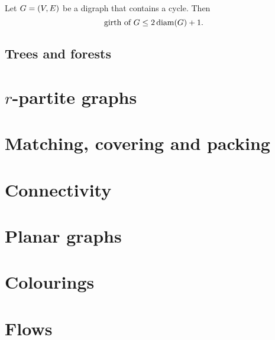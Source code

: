 \begin{lemma}
Let $G = \left( V,E \right)$ be a digraph that contains a cycle. Then
\[ \text{girth of $G$} \leq 2\operatorname{diam}(G) + 1. \]
\end{lemma}

\subsection{Trees and forests}

\section{$r$-partite graphs}

\section{Matching, covering and packing}

\section{Connectivity}

\section{Planar graphs}

\section{Colourings}

\section{Flows}